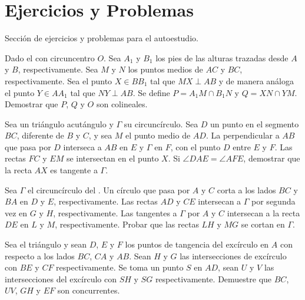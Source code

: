 \section{Ejercicios y Problemas}

Sección de ejercicios y problemas para el autoestudio.

\begin{section-problem}
    Dado el  con circuncentro $O$.
    Sea $A_1$ y $B_1$ los pies de las alturas trazadas desde $A$ y $B$, respectivamente.
    Sea $M$ y $N$ los puntos medios de $AC$ y $BC$, respectivamente.
    Sea el punto $X \in BB_1$ tal que $MX \perp AB$ y de manera análoga el punto $Y \in AA_1$ tal que $NY \perp AB$.
    Se define $P = A_1 M \cap B_1 N$ y $Q = XN \cap YM$.
    Demostrar que $P$, $Q$ y $O$ son colineales.
\end{section-problem}

\begin{section-problem}
    Sea  un triángulo acutángulo y $\Gamma$ su circuncírculo.
    Sea $D$ un punto en el segmento $BC$, diferente de $B$ y $C$, y sea $M$ el punto medio de $AD$.
    La perpendicular a $AB$ que pasa por $D$ interseca a $AB$ en $E$ y $\Gamma$ en $F$, con el punto $D$ entre $E$ y $F$.
    Las rectas $FC$ y $EM$ se intersectan en el punto $X$.
    Si $\angle DAE = \angle AFE$, demostrar que la recta $AX$ es tangente a $\Gamma$.
\end{section-problem}

\begin{section-problem}
    Sea $\Gamma$ el circuncírculo del .
    Un círculo que pasa por $A$ y $C$ corta a los lados $BC$ y $BA$ en $D$ y $E$, respectivamente.
    Las rectas $AD$ y $CE$ intersecan a $\Gamma$ por segunda vez en $G$ y $H$, respectivamente.
    Las tangentes a $\Gamma$ por $A$ y $C$ intersecan a la recta $DE$ en $L$ y $M$, respectivamente.
    Probar que las rectas $LH$ y $MG$ se cortan en $\Gamma$.
\end{section-problem}

\begin{section-problem}
    Sea el triángulo  y sean $D$, $E$ y $F$ los puntos de tangencia del excírculo en $A$ con respecto a los lados $BC$, $CA$ y $AB$.
    Sean $H$ y $G$ las intersecciones de excírculo con $BE$ y $CF$ respectivamente.
    Se toma un punto $S$ en $AD$, sean $U$ y $V$ las intersecciones del excírculo con $SH$ y $SG$ respectivamente.
    Demuestre que $BC$, $UV$, $GH$ y $EF$ son concurrentes.
\end{section-problem}